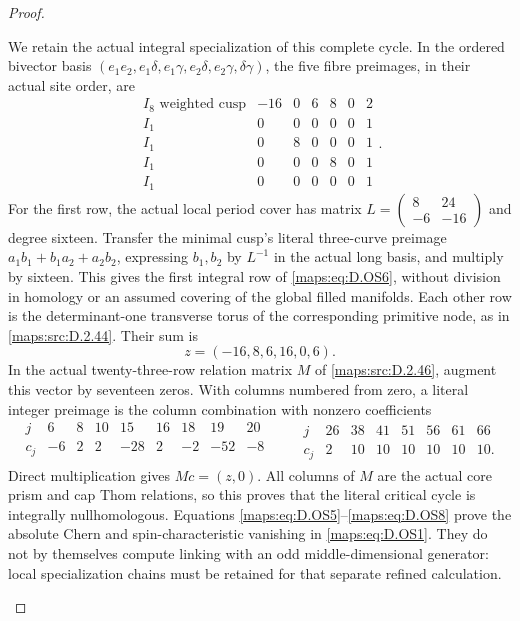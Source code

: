 \begin{proof}
\begin{enumerate}[label=\arabic*.,leftmargin=*]
We retain the actual integral specialization of this complete cycle.
In the ordered bivector basis
\((e_1e_2,e_1\delta,e_1\gamma,e_2\delta,e_2\gamma,\delta\gamma)\),
the five fibre preimages, in their actual site order, are
\[
 \begin{array}{c|rrrrrr}
 I_8\text{ weighted cusp}&-16&0&6&8&0&2\\
 I_1&0&0&0&0&0&1\\
 I_1&0&8&0&0&0&1\\
 I_1&0&0&0&8&0&1\\
 I_1&0&0&0&0&0&1
 \end{array}.                                             \tag{D.OS6}\label{maps:eq:D.OS6}
\]
For the first row, the actual local period cover has matrix
\(L=\left(\begin{smallmatrix}8&24\\-6&-16\end{smallmatrix}\right)\)
and degree sixteen. Transfer the minimal cusp's literal
three-curve preimage
\(a_1b_1+b_1a_2+a_2b_2\), expressing \(b_1,b_2\) by \(L^{-1}\)
in the actual long basis, and multiply by sixteen. This gives
the first integral row of \eqref{maps:eq:D.OS6}, without division in homology
or an assumed covering of the global filled manifolds.
Each other row is the determinant-one transverse torus of the
corresponding primitive node, as in \ref{maps:src:D.2.44}.
Their sum is
\[
                        z=(-16,8,6,16,0,6).              \tag{D.OS7}\label{maps:eq:D.OS7}
\]
In the actual twenty-three-row relation matrix \(M\) of
\ref{maps:src:D.2.46}, augment this vector by seventeen zeros. With columns
numbered from zero, a literal integer preimage is the column
combination with nonzero coefficients
\[
 \begin{array}{c|rrrrrrrr}
 j&6&8&10&15&16&18&19&20\\\hline
 c_j&-6&2&2&-28&2&-2&-52&-8\\
 \end{array}
 \qquad
 \begin{array}{c|rrrrrrr}
 j&26&38&41&51&56&61&66\\\hline
 c_j&2&10&10&10&10&10&10 .
 \end{array}                                             \tag{D.OS8}\label{maps:eq:D.OS8}
\]
Direct multiplication gives \(Mc=(z,0)\).
All columns of \(M\) are the actual core prism and cap Thom
relations, so this proves that the literal critical cycle is
integrally nullhomologous. Equations \eqref{maps:eq:D.OS5}--\eqref{maps:eq:D.OS8} prove
the absolute Chern and spin-characteristic vanishing in
\eqref{maps:eq:D.OS1}. They do not by themselves compute linking with an
odd middle-dimensional generator: local specialization chains
must be retained for that separate refined calculation.


\end{enumerate}
\end{proof}
